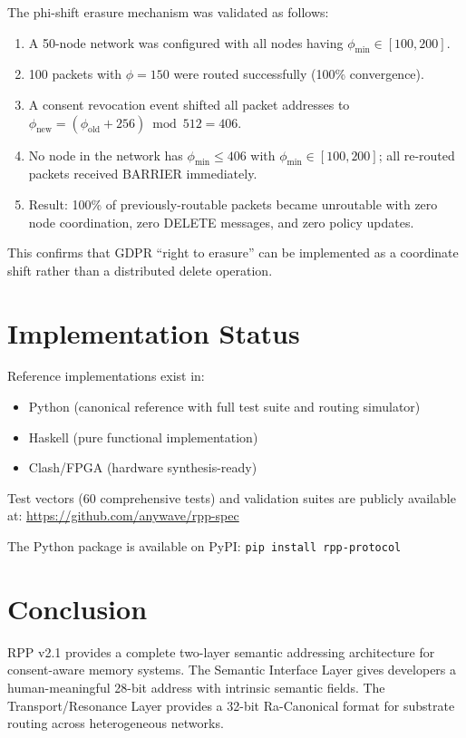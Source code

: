 \documentclass[11pt,a4paper]{article}
\begin{document}
The phi-shift erasure mechanism was validated as follows:

\begin{enumerate}
    \item A 50-node network was configured with all nodes having $\phi_{\min} \in [100, 200]$.
    \item 100 packets with $\phi = 150$ were routed successfully (100\% convergence).
    \item A consent revocation event shifted all packet addresses to $\phi_{\text{new}} = (\phi_{\text{old}} + 256) \bmod 512 = 406$.
    \item No node in the network has $\phi_{\min} \leq 406$ with $\phi_{\min} \in [100, 200]$; all re-routed packets received BARRIER immediately.
    \item Result: 100\% of previously-routable packets became unroutable with zero node coordination, zero DELETE messages, and zero policy updates.
\end{enumerate}

This confirms that GDPR ``right to erasure'' can be implemented as a coordinate shift rather than a distributed delete operation.

\section{Implementation Status}

Reference implementations exist in:
\begin{itemize}
    \item Python (canonical reference with full test suite and routing simulator)
    \item Haskell (pure functional implementation)
    \item Clash/FPGA (hardware synthesis-ready)
\end{itemize}

Test vectors (60 comprehensive tests) and validation suites are publicly available at:
\url{https://github.com/anywave/rpp-spec}

The Python package is available on PyPI: \texttt{pip install rpp-protocol}

\section{Conclusion}

RPP v2.1 provides a complete two-layer semantic addressing architecture for consent-aware memory systems. The Semantic Interface Layer gives developers a human-meaningful 28-bit address with intrinsic semantic fields. The Transport/Resonance Layer provides a 32-bit Ra-Canonical format for substrate routing across heterogeneous networks.
\end{document}
